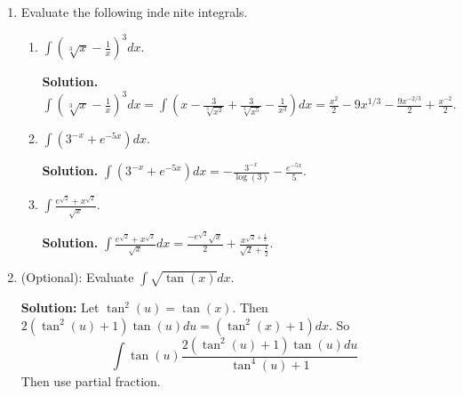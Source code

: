 \documentclass[12pt]{article}
\begin{document}
\begin{enumerate}
\begin{enumerate}
	{\bf Solution:} False. Because of the product rule.
        
        

    \end{enumerate}

\item Evaluate the following indenite integrals.
	\begin{enumerate}
	\item $\int (\sqrt[3]{x}-\frac{1}{x})^3 dx.$

	{\bf Solution.} $\int (\sqrt[3]{x}-\frac{1}{x})^3 dx= \int (x-\frac{3}{\sqrt[3]{x^2}} + \frac{3}{\sqrt[3]{x^5}} -\frac{1}{x^3})dx = \frac{x^2}{2} - 9x^{1/3} - \frac{9x^{-2/3}}{2} + \frac{x^{-2}}{2}.$

	\item $\int (3^{-x}+e^{-5x})dx.$

	{\bf Solution.} $\int  (3^{-x}+e^{-5x})dx= -\frac{3^{-x}}{\log(3)} -\frac{e^{-5x}}{5}$.

	\item $\int \frac{e^{\sqrt{2}}+x^{\sqrt{2}}}{\sqrt{x}}.$

	{\bf Solution.} $\int \frac{e^{\sqrt{2}}+x^{\sqrt{2}}}{\sqrt{x}} dx= \frac{-e^{\sqrt{2}}\sqrt{x}}{2} +\frac{x^{\sqrt{2}+\frac{1}{2}}}{\sqrt{2}+\frac{1}{2}}$.
	\end{enumerate}

\item (Optional): Evaluate $\int \sqrt{\tan(x)}dx$.

	{\bf Solution:} Let $\tan^2(u)=\tan(x)$. Then $2(\tan^2(u)+1)\tan(u)du=(\tan^2(x)+1)dx$. So 
$$\int \tan(u)\frac{2(\tan^2(u)+1)\tan(u)du}{\tan^4(u)+1}$$
Then use partial fraction.
\end{enumerate}
\end{document}
